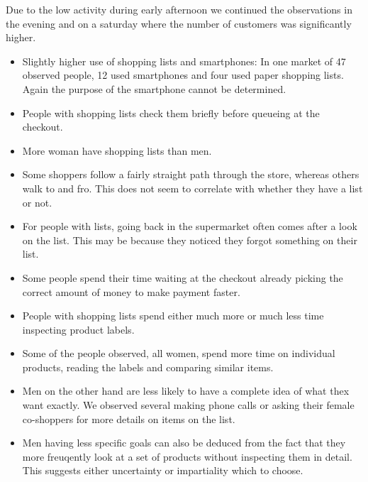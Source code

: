 \documentclass{scrartcl}
\begin{document}
      Due to the low activity during early afternoon we continued the observations in the evening and on a saturday where the number of customers was significantly higher.
      \begin{itemize}
        \item Slightly higher use of shopping lists and smartphones: In one market of 47 observed people, 12 used smartphones and four used paper shopping lists. 
          Again the purpose of the smartphone cannot be determined.
        \item People with shopping lists check them briefly before queueing at the checkout.
        \item More woman have shopping lists than men.
        \item Some shoppers follow a fairly straight path through the store, whereas others walk to and fro. This does not seem to correlate with whether they have a list or not.
        \item For people with lists, going back in the supermarket often comes after a look on the list. This may be because they noticed they forgot something on their list.
        \item Some people spend their time waiting at the checkout already picking the correct amount of money to make payment faster.
        \item People with shopping lists spend either much more or much less time inspecting product labels.
        \item Some of the people observed, all women, spend more time on individual products, reading the labels and comparing similar items.
        \item Men on the other hand are less likely to have a complete idea of what thex want exactly. 
          We observed several making phone calls or asking their female co-shoppers for more details on items on the list. 
        \item Men having less specific goals can also be deduced from the fact that they more freuqently look at a set of products without inspecting them in detail. 
          This suggests either uncertainty or impartiality which to choose.

      \end{itemize}
\end{document}
